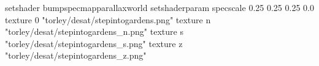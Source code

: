 setshader bumpspecmapparallaxworld
setshaderparam specscale 0.25 0.25 0.25 0.0
texture 0 "torley/desat/stepintogardens.png"
texture n "torley/desat/stepintogardens_n.png"
texture s "torley/desat/stepintogardens_s.png"
texture z "torley/desat/stepintogardens_z.png"

